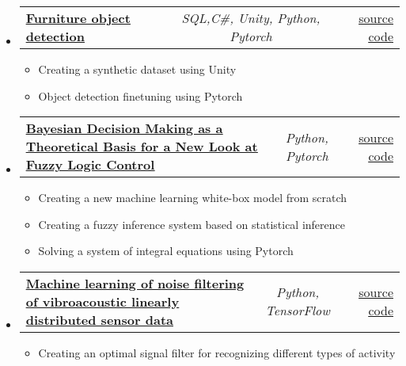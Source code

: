 \documentclass[a4paper,11pt]{article}
\makeatletter
\newcommand{\resumeItem}[1]{
  \item\small{#1}
}
\newcommand{\resumeItemListStart}{\begin{itemize}[rightmargin=0.11in]}
\newcommand{\resumeItemListEnd}{\end{itemize}}
\newcommand{\resumeTrioHeading}[3]{
  \item\small{
    \begin{tabular*}{0.96\textwidth}[t]{
      l@{\extracolsep{\fill}}c@{\extracolsep{\fill}}r
    }
      \textbf{#1} & \textit{#2} & #3
    \end{tabular*}
  }
}
\newcommand{\resumeHeadingListStart}{
  \begin{itemize}[leftmargin=0.15in, label={}]
}
\newcommand{\resumeHeadingListEnd}{\end{itemize}}
\makeatother
\begin{document}
  \resumeHeadingListStart{}
        \resumeTrioHeading{\href{https://github.com/RepnikovPavel/FurnitureDetection}{\uline{Furniture object detection}}}{ SQL,C\#, Unity, Python, Pytorch}{\href{https://github.com/RepnikovPavel/FurnitureDetection}{\uline{source code}}}
    \resumeItemListStart{}
    \resumeItem{Creating a synthetic dataset using Unity}
    \resumeItem{Object detection finetuning using Pytorch}
    \resumeItemListEnd{}
    \resumeHeadingListEnd

  
  \resumeHeadingListStart{}
    \resumeTrioHeading{\href{https://drive.google.com/drive/u/0/folders/1zftI7n1gPzwnwDx0ypsb0sOc0G7IpfPW}{\uline{Bayesian Decision Making as a Theoretical Basis for a New Look at Fuzzy Logic Control}}}{Python, Pytorch}{\href{https://github.com/RepnikovPavel/statistical_decision_making}{\uline{source code}}}
        \resumeItemListStart{}
        \resumeItem{Creating a new machine learning white-box model from scratch}
        \resumeItem{Creating a fuzzy inference system based on statistical inference}
        \resumeItem{Solving a system of integral equations using Pytorch}
        \resumeItemListEnd{}
\resumeHeadingListEnd

\resumeHeadingListStart{}
    \resumeTrioHeading{\href{https://drive.google.com/drive/u/0/folders/1q2EaWoaNGiwG4w1tQbm2k_c_2cM4j4Uv}{\uline{Machine learning of noise filtering of vibroacoustic linearly distributed sensor data}}}{Python, TensorFlow}{\href{https://github.com/RepnikovPavel/kursach_filtr_of_signal}{\uline{source code}}}
        \resumeItemListStart{}
          \resumeItem{Creating an optimal signal filter for recognizing different types of activity}
        \resumeItemListEnd{}
    \resumeHeadingListEnd





\end{document}
